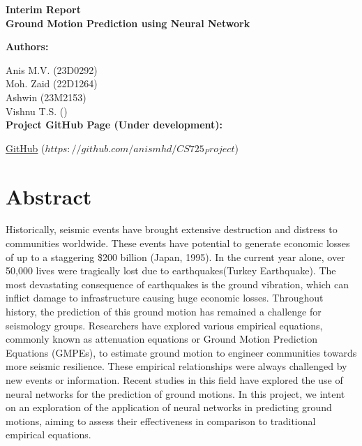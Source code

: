 \documentclass[a4paper,10pt]{article}
\begin{document}
\noindent 
\begin{center}
\textbf{{\large Interim Report \\ \Large Ground Motion Prediction using Neural Network}} \\
\end{center}


\noindent 
\textbf{Authors:}

\hspace{1 cm} Anis M.V. (23D0292) \\

\hspace{1 cm} Moh. Zaid (22D1264) \\

\hspace{1 cm} Ashwin (23M2153) \\

\hspace{1 cm} Vishnu T.S. () \\

\noindent 
\textbf{Project GitHub Page (Under development):}

\hspace{1 cm} \href{https://github.com/anismhd/CS725_Project}{GitHub} ($https://github.com/anismhd/CS725_Project$) \\


\section{Abstract}

Historically, seismic events have brought extensive destruction and distress to communities worldwide.
These events have potential to generate economic losses of up to a staggering \$200 billion (Japan, 1995).
In the current year alone, over 50,000 lives were tragically lost due to earthquakes(Turkey Earthquake).
The most devastating consequence of earthquakes is the ground vibration, which can inflict damage to infrastructure causing huge economic losses.
Throughout history, the prediction of this ground motion has remained a challenge for seismology groups. 
Researchers have explored various empirical equations, commonly known as attenuation equations or Ground Motion Prediction Equations (GMPEs), to estimate ground motion to engineer communities towards more seismic resilience. 
These empirical relationships were always challenged by new events or information. 
Recent studies in this field have explored the use of neural networks for the prediction of ground motions. 
In this project, we intent on an exploration of the application of neural networks in predicting ground motions, aiming to assess their effectiveness in comparison to traditional empirical equations.
\end{document}
